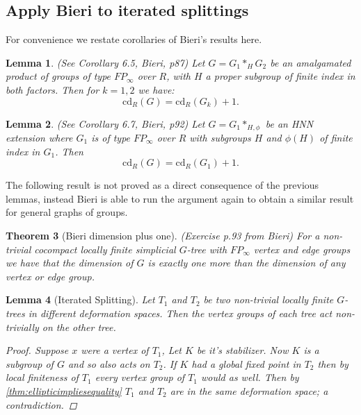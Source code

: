 \documentclass[12pt,parskip=full]{report}
\theoremstyle{plain}
\newtheorem{thm}{Theorem}[section]
\newtheorem{lem}[thm]{Lemma}
\theoremstyle{definition}
\begin{document}
\subsection{Apply Bieri to iterated splittings}

For convenience we restate corollaries of Bieri's results here.
\begin{lem}
(See Corollary 6.5, Bieri, p87)
Let \(G=G_1\ast_H G_2\) be an amalgamated product of groups of type \(FP_\infty\) over \(R\), with \(H\) a proper subgroup of finite index in both factors. Then for \(k=1,2\) we have: \[\text{cd}_R(G)=\text{cd}_R(G_k)+1.\]
\end{lem}

\begin{lem}
(See Corollary 6.7, Bieri, p92)
Let \(G=G_1\ast_{H,\phi}\) be an HNN extension where \(G_1\) is of type \(FP_\infty\) over \(R\) with subgroups \(H\) and \(\phi(H)\) of finite index in \(G_1\). Then \[\text{cd}_R(G) = \text{cd}_R(G_1)+1.\]
\end{lem}

The following result is not proved as a direct consequence of the previous lemmas, instead Bieri is able to run the argument again to obtain a similar result for general graphs of groups.
\begin{thm}
    [Bieri dimension plus one]
    \label{pro:bireridimension}
    (Exercise p.93 from Bieri)
    For a non-trivial cocompact locally finite simplicial \(G\)-tree with \(FP_\infty\) vertex and edge groups we have that the dimension of \(G\) is exactly one more than the dimension of any vertex or edge group.
\end{thm}

\begin{lem}
    [Iterated Splitting]
    \label{lem:iteratedsplitting} 
    Let \(T_1\) and \(T_2\) be two non-trivial locally finite \(G\)-trees in different deformation spaces. Then the vertex groups of each tree act non-trivially on the other tree.
    \begin{proof}
        Suppose \(x\) were a vertex of \(T_1\), Let \(K\) be it's stabilizer. Now \(K\) is a subgroup of \(G\) and so also acts on \(T_2\). If \(K\) had a global fixed point in \(T_2\)  then by local finiteness of \(T_1\) every vertex group of \(T_1\) would as well. Then by \ref{thm:ellipticimpliesequality} \(T_1\) and \(T_2\) are in the same deformation space; a contradiction.
    \end{proof}
\end{lem}
\end{document}
